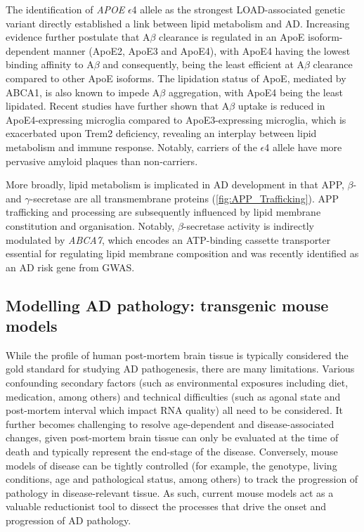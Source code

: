 \label{intro_lipid}
The identification of \textit{APOE} $\epsilon$4 allele as the strongest LOAD-associated genetic variant directly established a link between lipid metabolism and AD. Increasing evidence further postulate that A$\beta$ clearance is regulated in an ApoE isoform-dependent manner (ApoE2, ApoE3 and ApoE4)\cite{Castellano2011}, with ApoE4 having the lowest binding affinity to A$\beta$ and consequently, being the least efficient at A$\beta$ clearance compared to other ApoE isoforms\cite{RM2012}. The lipidation status of ApoE, mediated by ABCA1\cite{R2010}, is also known to impede A$\beta$ aggregation, with ApoE4 being the least lipidated\cite{DM2006}. Recent studies have further shown that A$\beta$ uptake is reduced in ApoE4-expressing microglia compared to ApoE3-expressing microglia, which is exacerbated upon Trem2 deficiency, revealing an interplay between lipid metabolism and immune response\cite{Fitz2021}. Notably, carriers of the $\epsilon$4 allele have more pervasive amyloid plaques than non-carriers\cite{DE1993,E2009}.

More broadly, lipid metabolism is implicated in AD development in that APP, $\beta$- and $\gamma$-secretase are all transmembrane proteins (\cref{fig:APP_Trafficking}). APP trafficking and processing are subsequently influenced by lipid membrane constitution and organisation\cite{DiPaolo2011}. Notably, $\beta$-secretase activity is indirectly modulated by \textit{ABCA7}, which encodes an ATP-binding cassette transporter essential for regulating lipid membrane composition and was recently identified as an AD risk gene from GWAS\cite{Sierksma2020,Sakae2016}.  


\clearpage
\subsection{Modelling AD pathology: transgenic mouse models}
\label{ch1_mouse_model}
While the profile of human post-mortem brain tissue is typically considered the gold standard for studying AD pathogenesis, there are many limitations. Various confounding secondary factors (such as environmental exposures including diet, medication, among others) and technical difficulties (such as agonal state and post-mortem interval which impact RNA quality) all need to be considered. It further becomes challenging to resolve age-dependent and disease-associated changes, given post-mortem brain tissue can only be evaluated at the time of death and typically represent the end-stage of the disease. Conversely, mouse models of disease can be tightly controlled (for example, the genotype, living conditions, age and pathological status, among others) to track the progression of pathology in disease-relevant tissue. As such, current mouse models act as a valuable reductionist tool to dissect the processes that drive the onset and progression of AD pathology\cite{Hall2012}.

